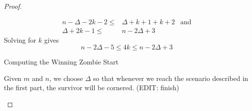 \begin{proof}
\begin{proofpart}
  \begin{align*}
   n - \Delta - 2k - 2 \leq & \Delta + k +1 + k +2 & \text{and} \\
   \Delta + 2k -1 \leq      & n - 2\Delta +3
  \end{align*}
  Solving for $k$ gives
  \[ n - 2\Delta -5 \leq 4k \leq n-2\Delta +3 \]

 \end{proofpart}

 \begin{proofpart} Computing the Winning Zombie Start

  Given $m$ and $n$, we choose $\Delta$ so that whenever we reach
  the scenario described in the first part, the survivor will be cornered.
  (EDIT: finish)
 \end{proofpart}
\end{proof}

